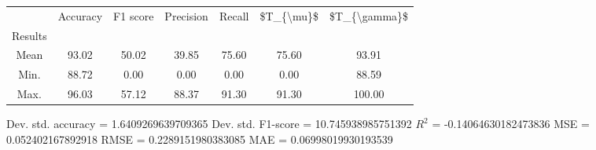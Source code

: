 \begin{tabular}{|c|c|c|c|c|c|c|}
\toprule
{} &  Accuracy &  F1 score &  Precision &  Recall &  \$T\_\{\textbackslash mu\}\$ &  \$T\_\{\textbackslash gamma\}\$ \\
Results &           &           &            &         &            &               \\
\hline
Mean    &     93.02 &     50.02 &      39.85 &   75.60 &      75.60 &         93.91 \\
Min.    &     88.72 &      0.00 &       0.00 &    0.00 &       0.00 &         88.59 \\
Max.    &     96.03 &     57.12 &      88.37 &   91.30 &      91.30 &        100.00 \\
\bottomrule
\end{tabular}

 Dev. std. accuracy = 1.6409269639709365
 Dev. std. F1-score = 10.745938985751392
 $R^2$ = -0.14064630182473836
 MSE = 0.052402167892918
 RMSE = 0.2289151980383085
 MAE = 0.06998019930193539